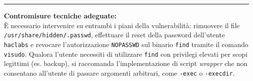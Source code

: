 \documentclass[11pt]{report}
\begin{document}
\begin{tcolorbox}[colback=gray!5, colframe=headerblue, arc=3pt, boxrule=0.8pt, breakable]
		\vspace{0.2cm}\hrule\vspace{0.2cm}
		
		\textbf{Contromisure tecniche adeguate:}\\
		È necessario intervenire su entrambi i piani della vulnerabilità: rimuovere il file \texttt{/usr/share/hidden/.passwd}, effettuare il reset della password dell'utente \texttt{haclabs} e revocare l'autorizzazione \texttt{NOPASSWD} sul binario \texttt{find} tramite il comando \texttt{visudo}. Qualora l'utente necessiti di utilizzare \texttt{find} con privilegi elevati per scopi legittimi (es. backup), si raccomanda l'implementazione di script \textit{wrapper} che non consentano all'utente di passare argomenti arbitrari, come \texttt{-exec} o \texttt{-execdir}.
	\end{tcolorbox}
	
\end{document}
